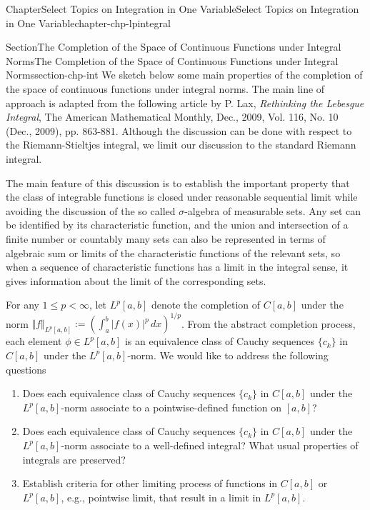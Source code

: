 \documentclass[oneside,10pt,]{book}
\numberwithin{equation}{section}
\begin{document}
\begin{chapterptx}{Chapter}{Select Topics on Integration in One Variable}{}{Select Topics on Integration in One Variable}{}{}{chapter-chp-lpintegral}
\typeout{************************************************}
%
\begin{sectionptx}{Section}{The Completion of the Space of Continuous Functions under Integral Norms}{}{The Completion of the Space of Continuous Functions under Integral Norms}{}{}{section-chp-int}
We sketch below some main properties of  the completion of the space of continuous functions under integral norms. The main line of approach is adapted from the following article by P. Lax, \emph{Rethinking the Lebesgue Integral}, The American Mathematical Monthly, Dec., 2009, Vol. 116, No. 10 (Dec., 2009), pp. 863-881. Although the discussion can be done with respect to the Riemann-Stieltjes integral, we limit our discussion to the standard Riemann integral.%
\par
The main feature of  this discussion is to establish the important property that the class of integrable functions is closed under reasonable sequential limit while avoiding the discussion of the so called \(\sigma\)-algebra of measurable sets. Any set can be identified by its characteristic function, and the union and intersection of a finite number or countably many sets can also be represented in terms of algebraic sum or limits of the characteristic functions of the relevant sets, so when a sequence of characteristic functions has a limit in the integral sense, it gives information about the limit of the corresponding	sets.%
\par
For any \(1\le p < \infty\), let \(L^{p}[a,  b]\) denote the completion of \(C[a, b]\) under the norm \(\Vert f \Vert_{L^{p}[a, b]} :=\left( \int_{a}^{b} |f(x)|^{p}\, dx\right)^{1/p}\). From the abstract completion process, each element \(\phi\in L^{p}[a,  b]\) is an equivalence class of Cauchy sequences \(\{ c_{k}\}\) in \(C[a, b]\) under the \(L^{p}[a,  b]\)-norm. We would like to address the following questions%
\par
%
\begin{enumerate}[label=\alph*.]
\item{}Does each equivalence class of Cauchy sequences \(\{ c_{k}\}\) in \(C[a, b]\) under the \(L^{p}[a,  b]\)-norm associate to a pointwise-defined function on \([a, b]\)?%
\item{}Does each equivalence class of Cauchy sequences \(\{ c_{k}\}\) in \(C[a, b]\) under the \(L^{p}[a,  b]\)-norm associate to a well-defined integral? What usual properties of integrals are preserved?%
\item{}Establish criteria for other limiting process of functions in \(C[a, b]\) or \(L^{p}[a,  b]\), e.g., pointwise limit, that result in a limit in \(L^{p}[a,  b]\).%

\end{enumerate}
\end{sectionptx}
\end{chapterptx}
\end{document}
